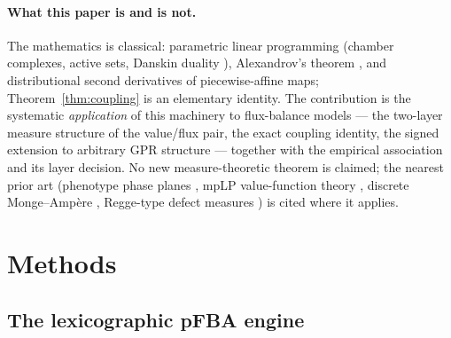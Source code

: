 \documentclass[11pt,a4paper]{article}
\theoremstyle{plain}
\theoremstyle{definition}
\theoremstyle{remark}
\begin{document}
\paragraph{What this paper is and is not.}
The mathematics is classical: parametric linear programming (chamber
complexes, active sets, Danskin duality \citep{danskin1967}), Alexandrov's theorem \citep{alexandrov1939}, and
distributional second derivatives of piecewise-affine maps;
Theorem~\ref{thm:coupling} is an elementary identity. The contribution
is the systematic \emph{application} of this machinery to flux-balance
models \citep{varma1994, orth2010, lewis2010} --- the two-layer measure structure of the value/flux pair,
the exact coupling identity, the signed extension to arbitrary GPR
structure --- together with the empirical association and its layer
decision. No new measure-theoretic theorem is claimed; the nearest
prior art (phenotype phase planes \citep{edwards2001, ibarra2002}, mpLP
value-function theory \citep{borrelli2003},
discrete Monge--Amp\`ere \citep{gutierrez2001}, Regge-type defect measures \citep{regge1961, cheeger1984}) is cited where
it applies.

\section{Methods}\label{sec:methods}

\subsection{The lexicographic pFBA engine}\label{sec:engine}
\end{document}
